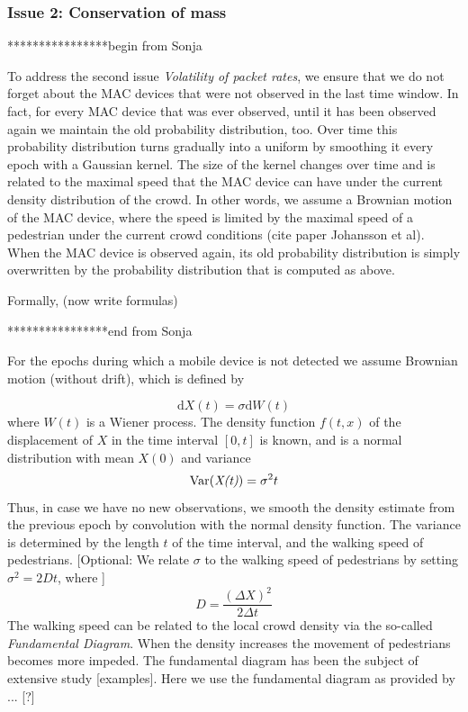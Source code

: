 \documentclass[10pt,a4paper]{article}
\begin{document}
\subsubsection{Issue 2: Conservation of mass }
****************begin from Sonja

To address the second issue {\it Volatility of packet rates}, we ensure that we do not forget about the MAC devices that were not observed in the last time window. In fact, for every MAC device that was ever observed, until it has been observed again we maintain the old probability distribution, too. Over time this probability distribution turns gradually into a uniform by smoothing it every epoch with a Gaussian kernel. The size of the kernel changes over time and is related to the maximal speed that the MAC device can have under the current density distribution of the crowd. In other words, we assume a Brownian motion of the MAC device, where the speed is limited by the maximal speed of a pedestrian under the current crowd conditions (cite paper Johansson et al). When the MAC device is observed again, its old probability distribution is simply overwritten by the probability distribution that is computed as above. 

Formally,  (now write formulas) 

****************end from Sonja\\

For the epochs during which a mobile device is not detected we assume Brownian motion (without drift), which is defined by

\begin{equation}
\text{d}X(t)=\sigma\text{d}W(t)
\end{equation}
where $W(t)$ is a Wiener process. The density function $f(t,x)$ of the displacement of $X$ in the time interval $[0,t]$ is known, and is a normal distribution with mean $X(0)$ and variance
\begin{equation}
\text{Var(\textit{X(t)})}=\sigma^{2}t
\end{equation}
Thus, in case we have no new observations, we smooth the density estimate from the previous epoch by convolution with the normal density function. 
The variance is determined by the length $t$ of the time interval, and the walking speed of pedestrians. 
[Optional: We relate $\sigma$ to the walking speed of pedestrians by setting $\sigma^2=2Dt$, where ]
\begin{equation}
D=\frac{(\Delta X)^2}{2\Delta t}
\end{equation}
The walking speed can be related to the local crowd density via the so-called \textit{Fundamental Diagram}. 
When the density increases the movement of pedestrians becomes more impeded.
The fundamental diagram has been the subject of extensive study [examples].
Here we use the fundamental diagram as provided by ... [?]
\end{document}
